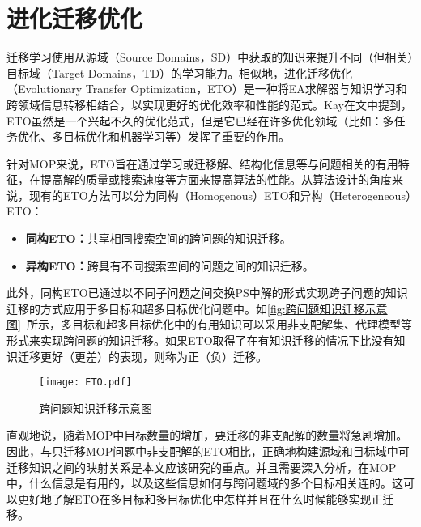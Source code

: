 \section{进化迁移优化}
\label{sec:背景介绍:进化迁移优化}
迁移学习使用从源域（Source Domains，SD）中获取的知识来提升不同（但相关）目标域（Target Domains，TD）的学习能力\cite{pan2009survey}。相似地，进化迁移优化（Evolutionary Transfer Optimization，ETO）是一种将EA求解器与知识学习和跨领域信息转移相结合，以实现更好的优化效率和性能的范式。Kay在文中提到\cite{tan2021evolutionary}，ETO虽然是一个兴起不久的优化范式，但是它已经在许多优化领域（比如：多任务优化、多目标优化和机器学习等）发挥了重要的作用。
\par
针对MOP来说，ETO旨在通过学习或迁移解、结构化信息等与问题相关的有用特征，在提高解的质量或搜索速度等方面来提高算法的性能。从算法设计的角度来说，现有的ETO方法可以分为同构（Homogenous）ETO和异构（Heterogeneous）ETO：
\begin{itemize}
    \item \textbf{同构ETO：}共享相同搜索空间的跨问题的知识迁移。
    \item \textbf{异构ETO：}跨具有不同搜索空间的问题之间的知识迁移。
\end{itemize}
此外，同构ETO已通过以不同子问题之间交换PS中解的形式实现跨子问题的知识迁移的方式应用于多目标和超多目标优化问题中\cite{tan2021evolutionary}。如\autoref{fig:跨问题知识迁移示意图}~所示，多目标和超多目标优化中的有用知识可以采用非支配解集、代理模型等形式来实现跨问题的知识迁移。如果ETO取得了在有知识迁移的情况下比没有知识迁移更好（更差）的表现，则称为正（负）迁移。
\begin{figure}[htb]
    \texttt{[image: ETO.pdf]}
    \caption[跨问题知识迁移示意图]{跨问题知识迁移示意图}
    \label{fig:跨问题知识迁移示意图}
\end{figure}
\par
直观地说，随着MOP中目标数量的增加，要迁移的非支配解的数量将急剧增加。因此，与只迁移MOP问题中非支配解的ETO相比，正确地构建源域和目标域中可迁移知识之间的映射关系是本文应该研究的重点。并且需要深入分析，在MOP中，什么信息是有用的，以及这些信息如何与跨问题域的多个目标相关连的。这可以更好地了解ETO在多目标和多目标优化中怎样并且在什么时候能够实现正迁移。

